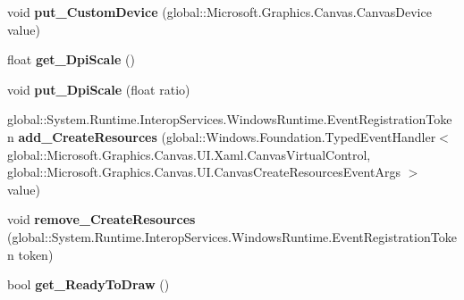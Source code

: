 \begin{DoxyCompactItemize}
void {\bfseries put\+\_\+\+Custom\+Device} (global\+::\+Microsoft.\+Graphics.\+Canvas.\+Canvas\+Device value)
\item 
\mbox{\label{interface_microsoft_1_1_graphics_1_1_canvas_1_1_u_i_1_1_xaml_1_1_i_canvas_virtual_control_a3a41a9a5588a50fb8543bc7b2fe40a83}} 
float {\bfseries get\+\_\+\+Dpi\+Scale} ()
\item 
\mbox{\label{interface_microsoft_1_1_graphics_1_1_canvas_1_1_u_i_1_1_xaml_1_1_i_canvas_virtual_control_a41445930b2afc9f40e2817d563c3b188}} 
void {\bfseries put\+\_\+\+Dpi\+Scale} (float ratio)
\item 
\mbox{\label{interface_microsoft_1_1_graphics_1_1_canvas_1_1_u_i_1_1_xaml_1_1_i_canvas_virtual_control_a07dc4062e5aad8e7a25c912a888eb205}} 
global\+::\+System.\+Runtime.\+Interop\+Services.\+Windows\+Runtime.\+Event\+Registration\+Token {\bfseries add\+\_\+\+Create\+Resources} (global\+::\+Windows.\+Foundation.\+Typed\+Event\+Handler$<$ global\+::\+Microsoft.\+Graphics.\+Canvas.\+U\+I.\+Xaml.\+Canvas\+Virtual\+Control, global\+::\+Microsoft.\+Graphics.\+Canvas.\+U\+I.\+Canvas\+Create\+Resources\+Event\+Args $>$ value)
\item 
\mbox{\label{interface_microsoft_1_1_graphics_1_1_canvas_1_1_u_i_1_1_xaml_1_1_i_canvas_virtual_control_af71d0732162524cbb84e8775794f761d}} 
void {\bfseries remove\+\_\+\+Create\+Resources} (global\+::\+System.\+Runtime.\+Interop\+Services.\+Windows\+Runtime.\+Event\+Registration\+Token token)
\item 
\mbox{\label{interface_microsoft_1_1_graphics_1_1_canvas_1_1_u_i_1_1_xaml_1_1_i_canvas_virtual_control_ad0524adf9910c3dfd2d10699b71f28d0}} 
bool {\bfseries get\+\_\+\+Ready\+To\+Draw} ()
\item 
\mbox{\label{interface_microsoft_1_1_graphics_1_1_canvas_1_1_u_i_1_1_xaml_1_1_i_canvas_virtual_control_a7d37fb0b34072ecd8bc9f32712ea4cba}} 

\end{DoxyCompactItemize}
